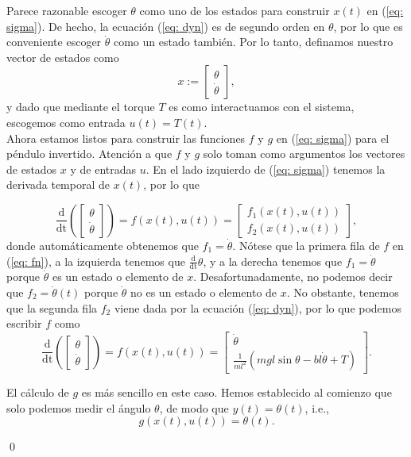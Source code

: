 \begin{example}
Parece razonable escoger $\theta$ como uno de los estados para construir $x(t)$ en (\ref{eq: sigma}). De hecho, la ecuación (\ref{eq: dyn}) es de segundo orden en $\theta$, por lo que es conveniente escoger $\dot\theta$ como un estado también. Por lo tanto, definamos nuestro vector de estados como
\begin{equation}
x := \begin{bmatrix}\theta \\ \dot\theta \end{bmatrix},
\end{equation}
y dado que mediante el torque $T$ es como interactuamos con el sistema, escogemos como entrada $u(t) = T(t)$.\\

Ahora estamos listos para construir las funciones $f$ y $g$ en (\ref{eq: sigma}) para el péndulo invertido. Atención a que $f$ y $g$ solo toman como argumentos los vectores de estados $x$ y de entradas $u$. En el lado izquierdo de (\ref{eq: sigma}) tenemos la derivada temporal de $x(t)$, por lo que

\begin{equation}
	\frac{\mathrm{d}}{\mathrm{dt}}\left(\begin{bmatrix}\theta \\ \dot\theta \end{bmatrix}\right) = f(x(t), u(t)) = \begin{bmatrix}f_1(x(t), u(t)) \\ f_2(x(t), u(t))\end{bmatrix}, \label{eq: fn}
\end{equation}
donde automáticamente obtenemos que $f_1 = \dot\theta$. Nótese que la primera fila de $f$ en (\ref{eq: fn}), a la izquierda tenemos que $\frac{\mathrm{d}}{\mathrm{dt}}\theta$, y a la derecha tenemos que $f_1 = \dot\theta$ porque $\dot\theta$ es un estado o elemento de $x$. Desafortunadamente, no podemos decir que $f_2 = \ddot\theta(t)$ porque $ \ddot\theta$ no es un estado o elemento de $x$. No obstante, tenemos que la segunda fila $f_2$ viene dada por la ecuación (\ref{eq: dyn}), por lo que podemos escribir $f$ como
\begin{equation}
	\frac{\mathrm{d}}{\mathrm{dt}}\left(\begin{bmatrix}\theta \\ \dot\theta \end{bmatrix}\right) =  f(x(t), u(t)) = \begin{bmatrix} \dot\theta \\ \frac{1}{ml^2}\left(mgl\sin{\theta}-bl\dot\theta + T\right) \end{bmatrix}. \label{eq: f}
\end{equation}

El cálculo de $g$ es más sencillo en este caso. Hemos establecido al comienzo que solo podemos medir el ángulo $\theta$, de modo que $y(t) = \theta(t)$, i.e.,
\begin{equation}
g(x(t),u(t)) =  \theta(t).
	\label{eq: g}
\end{equation}

\qed 
\end{example}

